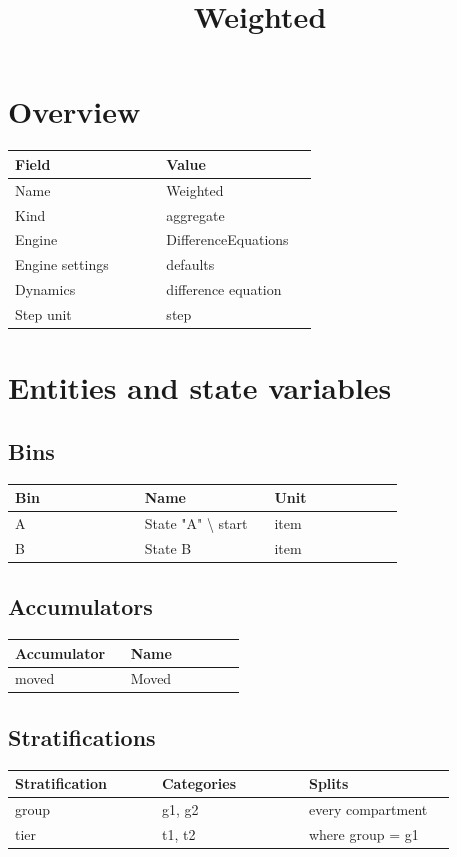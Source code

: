\documentclass{article}
\title{Weighted}
\date{}
\begin{document}
\maketitle
\section*{Overview}
\begin{longtable}{p{0.45\linewidth}p{0.45\linewidth}}
Field & Value \\
\hline
\endhead
Name & Weighted \\
Kind & aggregate \\
Engine & DifferenceEquations \\
Engine settings & defaults \\
Dynamics & difference equation \\
Step unit & step \\
\end{longtable}
\section*{Entities and state variables}
\subsection*{Bins}
\begin{longtable}{p{0.3\linewidth}p{0.3\linewidth}p{0.3\linewidth}}
Bin & Name & Unit \\
\hline
\endhead
A & State "A" \textbackslash{} start & item \\
B & State B & item \\
\end{longtable}
\subsection*{Accumulators}
\begin{longtable}{p{0.45\linewidth}p{0.45\linewidth}}
Accumulator & Name \\
\hline
\endhead
moved & Moved \\
\end{longtable}
\subsection*{Stratifications}
\begin{longtable}{p{0.3\linewidth}p{0.3\linewidth}p{0.3\linewidth}}
Stratification & Categories & Splits \\
\hline
\endhead
group & g1, g2 & every compartment \\
tier & t1, t2 & where group = g1 \\
\end{longtable}
\end{document}
